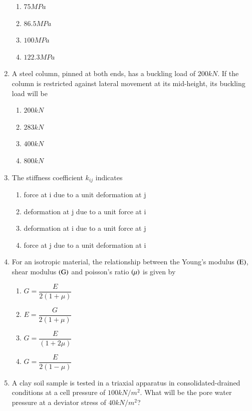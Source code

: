 \documentclass[journal,12pt,onecolumn]{IEEEtran}
\theoremstyle{remark}
\begin{document}
\begin{enumerate}
\hfill{}
\begin{enumerate}
\item $75MPa$
\item $86.5MPa$
\item $100MPa$
\item $122.3MPa$
\end{enumerate}

\item A steel column, pinned at both ends, has a buckling load of $200kN$. If the column is restricted against lateral movement at its mid-height, its buckling load will be

\hfill{}
\begin{enumerate}
\item $200kN$
\item $283kN$
\item $400kN$
\item $800kN$
\end{enumerate}

\item The stiffness coefficient $k_{ij}$ indicates

\hfill{}
\begin{enumerate}
\item force at i due to a unit deformation at j
\item deformation at j due to a unit force at i
\item deformation at i due to a unit force at j
\item force at j due to a unit deformation at i
\end{enumerate}

\item For an isotropic material, the relationship between the Young's modulus $\left(\text{E}\right)$, shear modulus $\left(\text{G}\right)$ and poisson's ratio $\left(\mu\right)$ is given by

\hfill{}
\begin{enumerate}
\item $G=\dfrac{E}{2(1+\mu)}$
\item $E=\dfrac{G}{2(1+\mu)}$
\item $G=\dfrac{E}{(1+2\mu)}$
\item $G=\dfrac{E}{2(1-\mu)}$
\end{enumerate}

\item  A clay soil sample is tested in a triaxial apparatus in consolidated-drained conditions at a cell pressure of $100 kN/m^2$. What will be the pore water pressure at a deviator stress of $40 kN/m^2$?


\end{enumerate}
\end{document}
